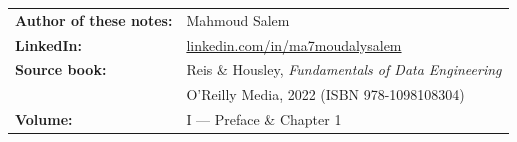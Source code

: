 \documentclass[12pt, a4paper, openany]{book}
\begin{document}
\vspace{1em}
\noindent
\begin{tabular}{@{}ll}
\textbf{Author of these notes:} & Mahmoud Salem \\
\textbf{LinkedIn:} & \href{https://www.linkedin.com/in/ma7moudalysalem}{linkedin.com/in/ma7moudalysalem} \\
\textbf{Source book:} & Reis \& Housley, \emph{Fundamentals of Data Engineering} \\
                      & O'Reilly Media, 2022 (ISBN 978-1098108304) \\
\textbf{Volume:} & I — Preface \& Chapter 1 \\
\end{tabular}

\clearpage

\setcounter{tocdepth}{2}
\tableofcontents
\clearpage
{}
\setcounter{page}{1}



\end{document}
